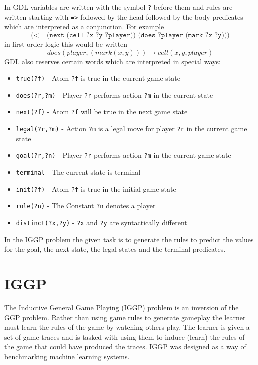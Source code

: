 In GDL variables are written with the symbol \texttt{?} before them and rules are written starting with \verb|=>| followed by the head followed by the body predicates which are interpreted as a conjunction. For example \[\texttt{(<= (next (cell ?x ?y ?player)) (does ?player (mark ?x ?y)))}\] in first order logic this would be written \[does(player,(mark(x,y))) \rightarrow cell(x,y,player)\]
GDL also reserves certain words which are interpreted in special ways:
\begin{itemize}
	\item \texttt{true(?f)} - Atom \texttt{?f} is true in the current game state
	\item \texttt{does(?r,?m)} - Player \texttt{?r} performs action \texttt{?m} in the current state
	\item \texttt{next(?f)} - Atom \texttt{?f} will be true in the next game state
	\item \texttt{legal(?r,?m)} - Action \texttt{?m} is a legal move for player \texttt{?r} in the current game state
	\item \texttt{goal(?r,?n)} - Player \texttt{?r} performs action \texttt{?m} in the current game state
	\item \texttt{terminal} - The current state is terminal
	\item \texttt{init(?f)} - Atom \texttt{?f} is true in the initial game state
	\item \texttt{role(?n)} - The Constant \texttt{?n} denotes a player
	\item \texttt{distinct(?x,?y)} - \texttt{?x} and \texttt{?y} are syntactically different
\end{itemize}

In the IGGP problem the given task is to generate the rules to predict the values for the goal, the next state, the legal states and the terminal predicates.



\section{IGGP}
The Inductive General Game Playing (IGGP) problem is an inversion of the GGP problem. Rather than using game rules to generate gameplay the learner must learn the rules of the game by watching others play. The learner is given a set of game traces and is tasked with using them to induce (learn) the rules of the game that could have produced the traces\cite{Cropper/IGGP}. IGGP was designed as a way of benchmarking machine learning systems.


